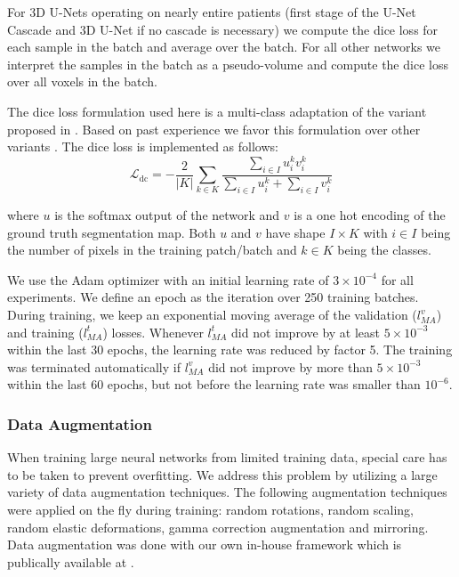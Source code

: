 \documentclass{templates/llncs} %
\newcommand{\MYhref}[3][blue]{\href{#2}{\color{#1}{#3}}}%
\begin{document}
    For 3D U-Nets operating on nearly entire patients (first stage of the U-Net Cascade and 3D U-Net if no cascade is necessary) we compute the dice loss for each sample in the batch and average over the batch. For all other networks we interpret the samples in the batch as a pseudo-volume and compute the dice loss over all voxels in the batch.
    
    The dice loss formulation used here is a multi-class adaptation of the variant proposed in  \cite{drozdzal2016importance}. Based on past experience \cite{isensee2017automatic,isensee2017brain} we favor this formulation over other variants \cite{milletari2016v,sudre2017generalised}. The dice loss is implemented as follows:
    \begin{equation}
    \mathcal{L}_\mathrm{dc} = - \frac{2}{|K|} \sum_{k\in K}\frac{\sum_{i\in I} u_i^k v_i^k}{\sum_{i\in I} u_i^k + \sum_{i\in I} v_i^k}
    \end{equation}
    
    where $u$ is the softmax output of the network and $v$ is a one hot encoding of the ground truth segmentation map. Both $u$ and $v$ have shape $I \times K$ with $i \in I$ being the number of pixels in the training patch/batch and $k\in K$ being the classes.
    
    We use the Adam optimizer with an initial learning rate of $3\times10^{-4}$ for all experiments. We define an epoch as the iteration over 250 training batches. During training, we keep an exponential moving average of the validation ($l_{MA}^{v}$) and training ($l_{MA}^{t}$) losses. Whenever $l_{MA}^{t}$ did not improve by at least $5\times 10^{-3}$ within the last 30 epochs, the learning rate was reduced by factor 5. The training was terminated automatically if $l_{MA}^{v}$ did not improve by more than $5\times 10^{-3}$ within the last 60 epochs, but not before the learning rate was smaller than $10^{-6}$.
    
    \subsubsection{Data Augmentation}
    When training large neural networks from limited training data, special care has to be taken to prevent overfitting. We address this problem by utilizing a large variety of data augmentation techniques. The following augmentation techniques were applied on the fly during training: random rotations, random scaling, random elastic deformations, gamma correction augmentation and mirroring. Data augmentation was done with our own in-house framework which is publically available at
    \MYhref{https://github.com/MIC-DKFZ/batchgenerators}{github.com/MIC-DKFZ/batchgenerators}.
    
\end{document}
